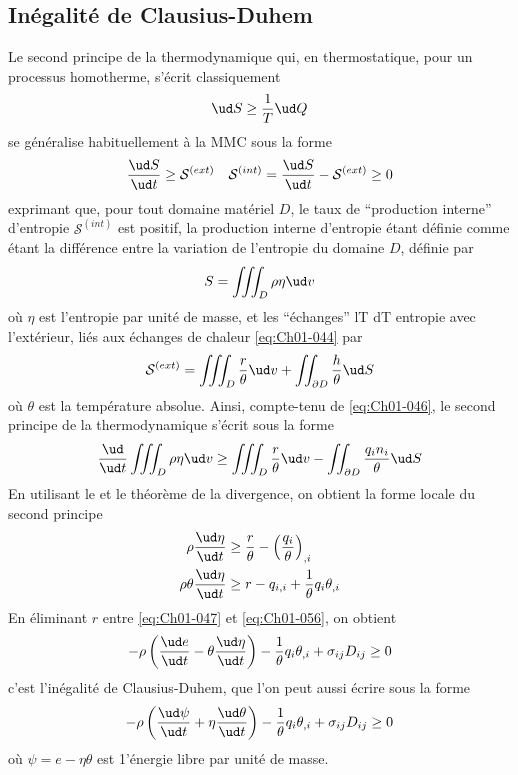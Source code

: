 \subsection{Inégalité de Clausius-Duhem} \label{ssec:Ch01-3.2}
Le second principe de la thermodynamique qui, en thermostatique, pour un processus homotherme, s'écrit classiquement
\begin{equation}
    \ud S \geq \frac{1}{T} \ud Q
    \label{eq:Ch01-051}
\end{equation}
se généralise habituellement à la MMC sous la forme 
\begin{equation}
    \frac{\ud S}{\ud t} \geq \mathcal{S}^{(ext)} \quad \mathcal{S}^{(int)} = \frac{\ud S}{\ud t} - \mathcal{S}^{(ext)} \geq 0
    \label{eq:Ch01-052}
\end{equation}
exprimant que, pour tout domaine matériel $D$, le taux de ``production interne'' d'entropie $\mathcal{S}^{(int)}$ est positif, la production interne d'entropie étant définie comme étant la différence entre la variation de l'entropie du domaine $D$, définie par
\begin{equation}
    S = \iiint_{D} \rho \eta \ud v
    \label{eq:Ch01-053}
\end{equation}
où $\eta$ est l'entropie par unité de masse, et les ``échanges'' lT dT entropie avec l'extérieur, liés aux échanges de chaleur \eqref{eq:Ch01-044} par
\begin{equation}
    \mathcal{S}^{(ext)} = \iiint_{D} \frac{r}{\theta} \ud v + \iint_{\partial D} \frac{h}{\theta} \ud S
    \label{eq:Ch01-054}
\end{equation}
où $\theta$ est la température absolue.
Ainsi, compte-tenu de \eqref{eq:Ch01-046}, le second principe de la thermodynamique s'écrit sous la forme
\begin{equation}
    \frac{\ud}{\ud t} \iiint_D \rho \eta \ud v \geq \iiint_{D} \frac{r}{\theta} \ud v - \iint_{\partial D} \frac{q_i n_i}{\theta} \ud S
    \label{eq:Ch01-055}
\end{equation}
En utilisant le  et le théorème de la divergence, on obtient la forme locale du second principe
\begin{align}
        \rho \frac{\ud \eta}{\ud t}  &\geq \frac{r}{\theta} - \left( \frac{q_i}{\theta} \right)_{,i} \nonumber\\
        \rho \theta \frac{\ud \eta}{\ud t}  &\geq r - q_{i,i} + \frac{1}{\theta} q_i\theta_{,i}
    \label{eq:Ch01-056}
\end{align}
En éliminant $r$ entre \eqref{eq:Ch01-047} et \eqref{eq:Ch01-056}, on obtient
\begin{equation}
    -\rho \left( \frac{\ud e}{\ud t} - \theta \frac{\ud \eta}{\ud t} \right) - \frac{1}{\theta}q_i \theta_{,i} + \sigma_{ij}D_{ij} \geq 0
    \label{eq:Ch01-057}
\end{equation}
c'est l'inégalité de Clausius-Duhem, que l'on peut aussi écrire sous la forme
\begin{equation}
    -\rho \left( \frac{\ud \psi}{\ud t} + \eta \frac{\ud \theta}{\ud t} \right) - \frac{1}{\theta}q_i \theta_{,i} + \sigma_{ij}D_{ij} \geq 0
    \label{eq:Ch01-058}
\end{equation}
où $\psi = e -\eta \theta$ est 1'énergie libre par unité de masse.

